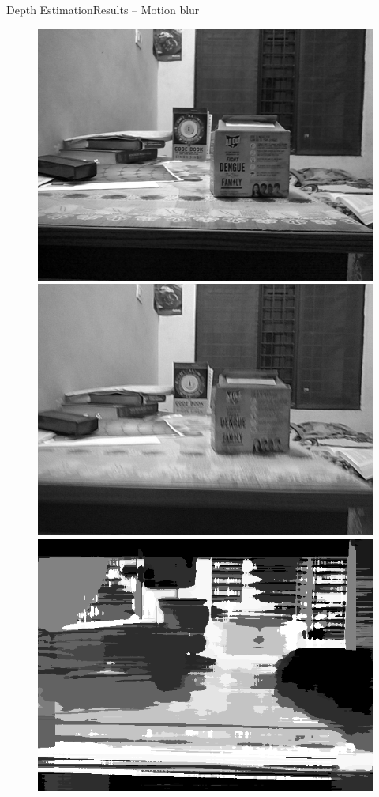 \documentclass{beamer}
\begin{document}
\begin{frame}{Depth Estimation}{Results -- Motion blur}
\begin{figure}[H]
\begin{center}
\resizebox{30mm}{!} {\includegraphics {../images/depth/eg3/preview_im.png}}
\resizebox{30mm}{!} {\includegraphics {../images/depth/eg3/saved_im_gray.png}}
\resizebox{30mm}{!} {\includegraphics {../images/depth/eg3/imdepth.png}}
\end{center}
\end{figure}


\end{frame}
\end{document}

